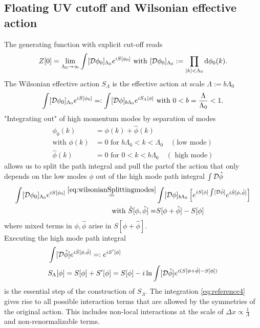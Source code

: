 \subsection{Floating UV cutoff and Wilsonian effective action}
\begin{mybox}{}
	The generating function with explicit cut-off reads
	\begin{equation}
	Z[0] = \lim_{\Lambda_0 \rightarrow \infty} \int [\mathcal{D} \phi_0]_{\Lambda_0} e^{i S[\phi_0]} \text{ with } [\mathcal{D} \phi_0]_{\Lambda_0} := \prod_{\abs{k}<\Lambda_0} \mathrm{d} \phi_0 (k).
		\end{equation}
	The Wilsonian effective action $S_\Lambda$ is the effective action at scale $\Lambda:=b\Lambda_0$
	\begin{equation}
	\label{eq:wilsonianeffectiveaction}
		\int [\mathcal{D} \phi_0]_{\Lambda_0} e^{i S[\phi_0]} =: \int [\mathcal{D}\phi]_{b\Lambda_0} e^{iS_\Lambda[\phi]} \text{ with } 0<b=\frac{\Lambda}{\Lambda_0}<1.
	\end{equation}
	"Integrating out" of high momentum modes by separation of modes
	\begin{align}
		\phi_0(k) &= \phi(k) +\hat{ \phi}(k)\label{eq:wilsonianSplittingmodes} \\
		\text{with } \phi(k) &= 0 \text{ for } b\Lambda_0<k<\Lambda_0 \quad (\text{low mode})\\
		\hat{ \phi}(k) &= 0 \text{ for } 0<k<b\Lambda_0 \quad (\text{ high mode})
	\end{align}
allows us to split the path integral and pull the partof the action that only depends on the low modes $\phi$ out of the high mode path integral $\int \mathcal{D} \hat{ \phi}$
	\begin{align}
		\int [\mathcal{D} \phi_0]_{\Lambda_0} e^{i S[\phi_0]} \stackrel{\ref{eq:wilsonianSplittingmodes}}{=}& \int [\mathcal{D}\phi]_{b\Lambda_0}\left[e^{iS[\phi] \int [\mathcal{D} \hat{ \phi}]} e^{i \hat{S}[\phi,\hat{ \phi}]}\right]  \\
		\text{ with } \hat{S}[\phi,\hat{ \phi}] =& S[\phi+\hat{ \phi}]-S[\phi]
	\end{align}
where mixed terms in $\phi,\hat{ \phi}$ arise in $S[\phi+\hat{ \phi}]$.\\
Executing the high mode path integral
\begin{align}
	\label{eq:reference4}
&	\int [\mathcal{D} \hat{ \phi}] e^{i \hat{S}[\phi,\hat{ \phi}]} =: e^{i S^\prime[\phi]}\\
&S_\Lambda[\phi] = S[\phi] + S^\prime[\phi] = S[\phi] -i \ln \int [\mathcal{D} \hat{ \phi}] e^{i (S[\phi+\hat{ \phi} ] - S[\phi])}
\end{align}
is the essential step of the construction of $S_\Lambda$. The integration \ref{eq:reference4} gives rise to all possible interaction terms that are allowed by the symmetries of the original action. This includes non-local interactions at the scale of $\Delta x \propto \frac{1}{\Lambda}$ and non-renormalizable terms.
	
\end{mybox}
